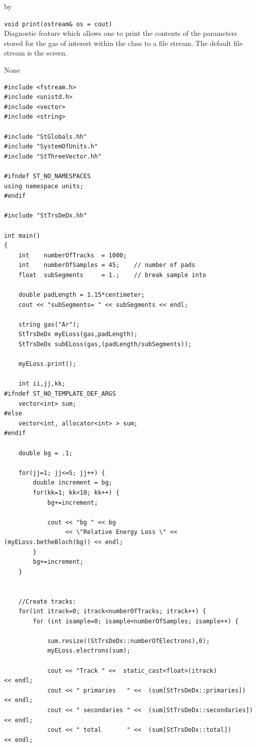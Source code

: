 \documentclass[twoside]{article}
\newcommand{\entrylabel}[1]{\mbox{\textbf{{#1}}}\hfil}%
\newenvironment{entry}
{\begin{list}{}%
    {\renewcommand{\makelabel}{\entrylabel}%
     \setlength{\labelwidth}{90pt}%
     \setlength{\leftmargin}{\labelwidth}
     \advance\leftmargin by \labelsep%
      }%
    }%
  {\end{list}}
\newcommand{\Entrylabel}[1]%
{\raisebox{0pt}[1ex][0pt]{\makebox[\labelwidth][l]%
    {\parbox[t]{\labelwidth}{\hspace{0pt}\textbf{{#1}}}}}}
\newenvironment{Entry}%
{\renewcommand{\entrylabel}{\Entrylabel}\begin{entry}}%
  {\end{entry}}
\begin{document}
\begin{Entry}
  \verb+void print(ostream& os = cout)+\\
  Diagnostic feature which allows one to print the contents of
  the parameters stored for the gas of interest within the class
  to a file stream.  The default file stream is the screen.

\item[Non-Member \\ Operators]
  None

\item[Example]


{\footnotesize
\begin{verbatim}
#include <fstream.h>
#include <unistd.h>
#include <vector>
#include <string>

#include "StGlobals.hh"
#include "SystemOfUnits.h"
#include "StThreeVector.hh"

#ifndef ST_NO_NAMESPACES
using namespace units;
#endif

#include "StTrsDeDx.hh"

int main()
{
    int    numberOfTracks  = 1000;
    int    numberOfSamples = 45;    // number of pads
    float  subSegments     = 1.;    // break sample into

    double padLength = 1.15*centimeter;
    cout << "subSegments= " << subSegments << endl;
    
    string gas("Ar");
    StTrsDeDx myELoss(gas,padLength);
    StTrsDeDx subELoss(gas,(padLength/subSegments));
 
    myELoss.print();

    int ii,jj,kk;
#ifndef ST_NO_TEMPLATE_DEF_ARGS
    vector<int> sum;
#else
    vector<int, allocator<int> > sum;
#endif    
    
    double bg = .1;

    for(jj=1; jj<=5; jj++) {
        double increment = bg;
        for(kk=1; kk<10; kk++) {
            bg+=increment;

            cout << "bg " << bg 
                 << \"Relative Energy Loss \" << (myELoss.betheBloch(bg)) << endl;
        }
        bg+=increment;
    }

    
    //Create tracks:
    for(int itrack=0; itrack<numberOfTracks; itrack++) {
        for (int isample=0; isample<numberOfSamples; isample++) {

            sum.resize((StTrsDeDx::numberOfElectrons),0);
            myELoss.electrons(sum);

            cout << "Track " <<  static_cast<float>(itrack)           << endl;
            cout << " primaries   " <<  (sum[StTrsDeDx::primaries])   << endl;
            cout << " secondaries " <<  (sum[StTrsDeDx::secondaries]) << endl;
            cout << " total       " <<  (sum[StTrsDeDx::total])       << endl;


\end{verbatim}}
\end{Entry}
\end{document}
